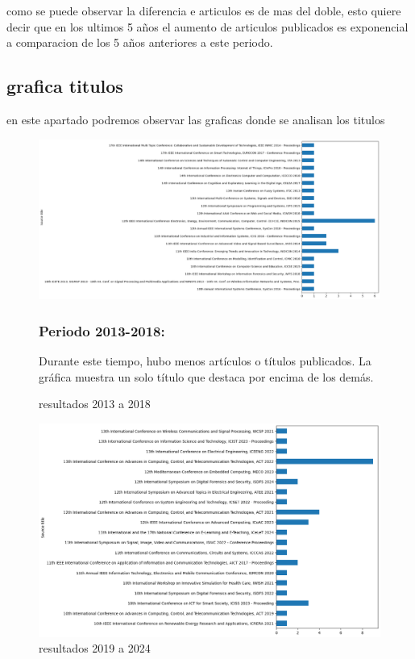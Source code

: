 \documentclass[conference]{IEEEtran}
\begin{document}
como se puede observar la diferencia e articulos es de mas del doble, esto quiere decir que en los ultimos 5 años el aumento de articulos publicados es exponencial a comparacion de los 5 años anteriores a este periodo.

\subsection{grafica titulos}
en este apartado podremos observar las graficas donde se analisan los titulos 
\begin{figure}[H]
    \centering
    \includegraphics[width=1\linewidth]{titulos2013.png}
    \caption{resultados 2013 a 2018}
    \label{fig:enter-label}

\subsubsection{Periodo 2013-2018:}
Durante este tiempo, hubo menos artículos o títulos publicados.
La gráfica muestra un solo título que destaca por encima de los demás.
\end{figure}
\begin{figure}[H]
    \centering
    \includegraphics[width=1\linewidth]{titulos2019.png}
    \caption{resultados 2019 a 2024}
    \label{fig:enter-label}
\end{figure}
\end{document}
